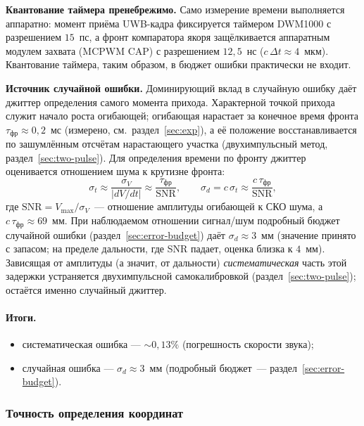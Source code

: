 \textbf{Квантование таймера пренебрежимо.}
Само измерение времени выполняется аппаратно: момент приёма UWB-кадра фиксируется таймером
DWM1000 с разрешением $15$~пс, а фронт компаратора якоря защёлкивается аппаратным модулем
захвата (MCPWM CAP) с разрешением $12{,}5$~нс ($c\,\Delta t \approx 4$~мкм). Квантование
таймера, таким образом, в бюджет ошибки практически не входит.

\textbf{Источник случайной ошибки.}
Доминирующий вклад в случайную ошибку даёт джиттер определения самого момента прихода.
Характерной точкой прихода служит начало роста огибающей; огибающая нарастает за конечное
время фронта $\tau_{\text{фр}} \approx 0{,}2$~мс (измерено, см.\ раздел~\ref{sec:exp}), а её
положение восстанавливается по зашумлённым отсчётам нарастающего участка (двухимпульсный
метод, раздел~\ref{sec:two-pulse}). Для определения времени по фронту джиттер оценивается
отношением шума к крутизне фронта:
\begin{equation}
  \sigma_t \approx \frac{\sigma_V}{|dV/dt|} \approx \frac{\tau_{\text{фр}}}{\mathrm{SNR}},
  \qquad
  \sigma_d = c\,\sigma_t \approx \frac{c\,\tau_{\text{фр}}}{\mathrm{SNR}},
\end{equation}
где $\mathrm{SNR} = V_{\max}/\sigma_V$~--- отношение амплитуды огибающей к СКО шума,
а $c\,\tau_{\text{фр}} \approx 69$~мм. При наблюдаемом отношении сигнал/шум подробный
бюджет случайной ошибки (раздел~\ref{sec:error-budget}) даёт $\sigma_d \approx 3$~мм
(значение принято с запасом; на пределе дальности, где SNR падает, оценка близка
к $4$~мм). Зависящая от амплитуды (а значит, от дальности) \emph{систематическая}
часть этой задержки устраняется двухимпульсной самокалибровкой
(раздел~\ref{sec:two-pulse}); остаётся именно случайный джиттер.

\paragraph{Итоги.}
\begin{itemize}
  \item систематическая ошибка --- ${\sim}0{,}13\%$ (погрешность скорости звука);
  \item случайная ошибка --- $\sigma_d \approx 3$~мм (подробный бюджет~--- раздел~\ref{sec:error-budget}).
\end{itemize}

\subsubsection{Точность определения координат}

